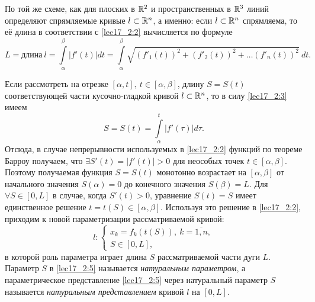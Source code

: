 \documentclass[../../main.tex]{subfiles}
\begin{document}
По той же схеме, как для плоских в $\mathbb{R}^2$ и пространственных в $\mathbb{R}^3$ 
линий определяют спрямляемые кривые $l \subset \mathbb{R}^n$, а именно:
если $l \subset \mathbb{R}^n$ спрямляема, то её длина 
в соответствии с \eqref{lec17_2:2}
вычисляется по формуле
\begin{equation}
 \label{lec17_2:3}
 L = \text{длина}\ l = \int\limits_\alpha^\beta|f'(t)|dt =  
 \int\limits_\alpha^\beta\sqrt{(f'_1(t))^2 + (f'_2(t))^2 
 + \dots (f'_n(t))^2}\:dt.
\end{equation}

Если рассмотреть на отрезке $[\alpha, t],\ t \in \left[\alpha, \beta\right]$,
длину $S = S(t)$ соответствующей части кусочно-гладкой 
кривой $l \subset \mathbb{R}^n$, 
то в силу \eqref{lec17_2:3} имеем
\begin{equation}
\label{lec17_2:4}
 S = S(t) = \int\limits_\alpha^t|f'(\tau)|d\tau.
\end{equation}
Отсюда, в случае непрерывности используемых в \eqref{lec17_2:2} 
функций по теореме Барроу получаем, что $\exists S'(t) = |f'(t)|>0$
для неособых точек $t \in \left[\alpha, \beta \right]$.
Поэтому получаемая функция $S = S(t)$ монотонно возрастает 
на $\left[\alpha, \beta \right]$ от начального значения  $S(\alpha) = 0$ 
до конечного значения $S(\beta) = L$.
Для $\forall S \in \left[0, L \right]$ в случае, когда $S'(t) > 0$, уравнение
$S(t) = S$ имеет единственное решение 
$t = t(S) \in \left[\alpha, \beta \right]$.
Используя это решение в \eqref{lec17_2:2}, приходим к новой параметризации
рассматриваемой кривой:
\begin{equation}
 \label{lec17_2:5}
 l:
 \begin{cases}
      x_k = f_k(t(S)),\ k = \overline{1,n},\\
      S \in \left[0, L \right],
 \end{cases}
\end{equation}
в которой роль параметра играет длина $S$ рассматриваемой части дуги $L$.
Параметр $S$ в \eqref{lec17_2:5} называется \emph{натуральным параметром}, 
а параметрическое представление \eqref{lec17_2:5} через натуральный параметр 
$S$
называется \emph{натуральным представлением} кривой $l$ на $[0, L]$.
\end{document}

